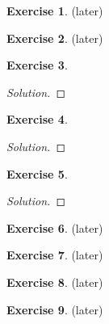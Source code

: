 \documentclass[12pt,a4]{article}
\theoremstyle{definition}
\newtheorem{exercise}{Exercise}
\begin{document}
\begin{exercise}
	(later)
\end{exercise}

\begin{exercise}
	(later)
\end{exercise}

\begin{exercise}
	
\end{exercise}
\begin{proof}[Solution]
	
\end{proof}

\begin{exercise}
	
\end{exercise}
\begin{proof}[Solution]
	
\end{proof}

\begin{exercise}
	
\end{exercise}
\begin{proof}[Solution]
	
\end{proof}

\begin{exercise}
	(later) 
\end{exercise}

\begin{exercise}
	(later) 
\end{exercise}

\begin{exercise}
	(later) 
\end{exercise}

\begin{exercise}
	(later) 
\end{exercise}
\end{document}
